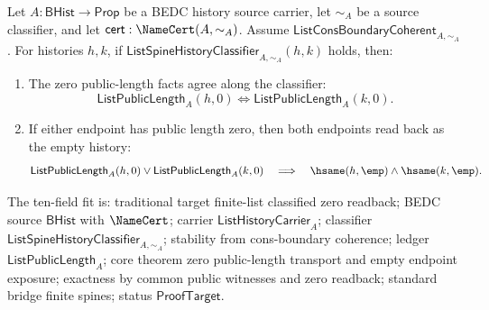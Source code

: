 \begin{theorem}
\label{thm:list-classified-zero-length-endpoint-readback}
Let $A:\mathsf{BHist}\to\mathsf{Prop}$ be a BEDC history source carrier, let
$\sim_A$ be a source classifier, and let
$\mathsf{cert}:\NameCert(A,\sim_A)$. Assume
$\mathsf{ListConsBoundaryCoherent}_{A,\sim_A}$. For histories $h,k$, if
$\mathsf{ListSpineHistoryClassifier}_{A,\sim_A}(h,k)$ holds, then:
\begin{enumerate}
  \item The zero public-length facts agree along the classifier:
  $$
  \mathsf{ListPublicLength}_A(h,0)
  \Longleftrightarrow
  \mathsf{ListPublicLength}_A(k,0).
  $$

  \item If either endpoint has public length zero, then both endpoints read
  back as the empty history:
  $$
  \mathsf{ListPublicLength}_A(h,0)\vee
  \mathsf{ListPublicLength}_A(k,0)
  \quad\Longrightarrow\quad
  \hsame(h,\emp)\land\hsame(k,\emp).
  $$
\end{enumerate}
The ten-field fit is: traditional target finite-list classified zero readback;
BEDC source $\mathsf{BHist}$ with $\NameCert$; carrier
$\mathsf{ListHistoryCarrier}_A$; classifier
$\mathsf{ListSpineHistoryClassifier}_{A,\sim_A}$; stability from
cons-boundary coherence; ledger $\mathsf{ListPublicLength}_A$; core theorem
zero public-length transport and empty endpoint exposure; exactness by common
public witnesses and zero readback; standard bridge finite spines; status
$\mathsf{ProofTarget}$.
\end{theorem}
